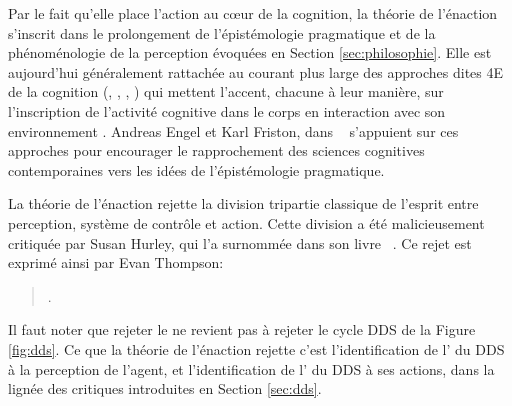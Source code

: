 Par le fait qu'elle place l'action au c\oe ur de la cognition, la théorie de l'énaction s'inscrit dans le prolongement de l'épistémologie pragmatique et de la phénoménologie de la perception évoquées en Section \ref{sec:philosophie}.
Elle est aujourd'hui généralement rattachée au courant plus large des approches dites 4E de la cognition (, , , ) qui mettent l'accent, chacune à leur manière, sur l'inscription de l'activité cognitive dans le corps en interaction avec son environnement \cite[]{newen_oxford_2018}.
Andreas Engel et Karl Friston, dans \og {} \fg\ \cite{engel_pragmatic_2015} s'appuient sur ces approches pour 
encourager le rapprochement des sciences cognitives contemporaines vers les idées de l'épistémologie pragmatique.

La théorie de l'énaction rejette la division tripartie classique de l'esprit entre perception, système de contrôle et action.
Cette division a été malicieusement critiquée par Susan Hurley, qui l'a surnommée  dans son livre \og {} \fg\ \cite{hurley_consciousness_2002}. 
Ce rejet est exprimé ainsi par Evan Thompson: 

\begin{quote}
\cite{thompson_review_2018}.
\end{quote}

Il faut noter que rejeter le  ne revient pas à rejeter le cycle DDS de la Figure \ref{fig:dds}. 
Ce que la théorie de l'énaction rejette c'est l'identification de l' du DDS à la perception de l'agent, et l'identification de l' du DDS à ses actions, dans la lignée des critiques introduites en Section \ref{sec:dds}.



